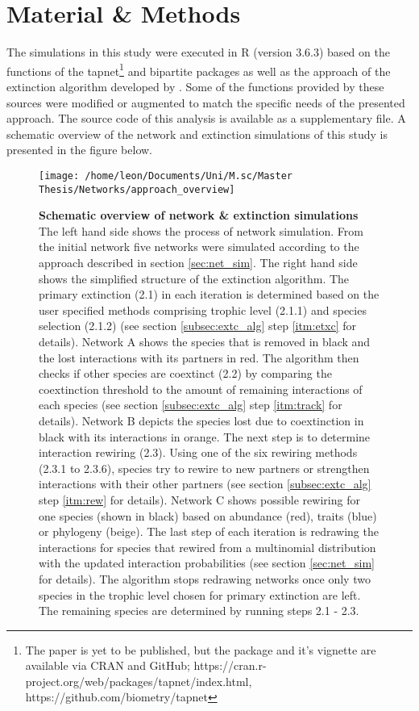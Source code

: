 \documentclass[12pt,a4paper]{article}
\begin{document}
	\section{Material \& Methods}
	The simulations in this study were executed in R \parencite{Rcore} (version 3.6.3) based on the functions of the tapnet\footnote{The paper is yet to be published, but the package and it's vignette are available via CRAN and GitHub; https://cran.r-project.org/web/packages/tapnet/index.html, https://github.com/biometry/tapnet} \parencite{Benadi} and bipartite \parencite{Dormann2008} packages as well as the approach of the extinction algorithm developed by \citeauthor{Vizentin-Bugoni2019} \parencite{Vizentin-Bugoni2019}. Some of the functions provided by these sources were modified or augmented to match the specific needs of the presented approach. The source code of this analysis is available as a supplementary file. A schematic overview of the network and extinction simulations of this study is presented in the figure below.	
	
	\begin{figure}[H]
	 \texttt{[image: /home/leon/Documents/Uni/M.sc/Master Thesis/Networks/approach\_overview]}
	 \caption{\textbf{Schematic overview of network \& extinction simulations} The left hand side shows the process of network simulation. From the initial network five networks were simulated according to the approach described in section \ref{sec:net_sim}. The right hand side shows the simplified structure of the extinction algorithm. The primary extinction (2.1) in each iteration is determined based on the user specified methods comprising trophic level (2.1.1) and species selection (2.1.2) (see section \ref{subsec:extc_alg} step \ref{itm:etxc} for details). Network A shows the species that is removed in black and the lost interactions with its partners in red. The algorithm then checks if other species are coextinct (2.2) by comparing the coextinction threshold to the amount of remaining interactions of each species (see section \ref{subsec:extc_alg} step \ref{itm:track} for details). Network B depicts the species lost due to coextinction in black with its interactions in orange. The next step is to determine interaction rewiring (2.3). Using one of the six rewiring methods (2.3.1 to 2.3.6), species try to rewire to new partners or strengthen interactions with their other partners (see section \ref{subsec:extc_alg} step \ref{itm:rew} for details). Network C shows possible rewiring for one species (shown in black) based on abundance (red), traits (blue) or phylogeny (beige).
	 The last step of each iteration is redrawing the interactions for species that rewired from a multinomial distribution with the updated interaction probabilities (see section \ref{sec:net_sim} for details). The algorithm stops redrawing networks once only two species in the trophic level chosen for primary extinction are left. The remaining species are determined by running steps 2.1 - 2.3.}
	 \label{fig:extc_alg}
\end{figure}
		\par
\end{document}
